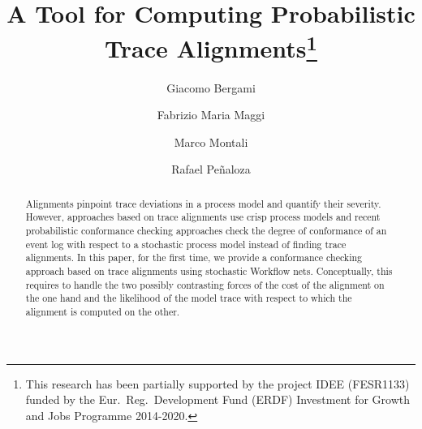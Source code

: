 \documentclass[runningheads]{llncs}
\begin{document}
%
\title{A Tool for Computing Probabilistic Trace Alignments\thanks{This research has been partially supported by the project IDEE (FESR1133) funded by the Eur.\ Reg.\ Development Fund (ERDF) Investment for Growth and Jobs Programme 2014-2020. }}
%
%
\author{Giacomo Bergami \and
Fabrizio Maria Maggi \and
Marco Montali \and
Rafael Pe\~naloza}
%
%
%
\maketitle              %
%
\begin{abstract}
Alignments pinpoint trace deviations in a process model and quantify their severity. However, approaches based on trace alignments use crisp process models and recent probabilistic conformance checking approaches check the degree of conformance of an event log with respect to a stochastic process model instead of finding trace alignments. In this paper, for the first time, we provide a conformance checking approach based on trace alignments using stochastic Workflow nets. Conceptually, this requires to handle the two possibly contrasting forces of the cost of the alignment on the one hand and the likelihood of the model trace with respect to which the alignment is computed on the other.

\end{abstract}



%


%





\end{document}
